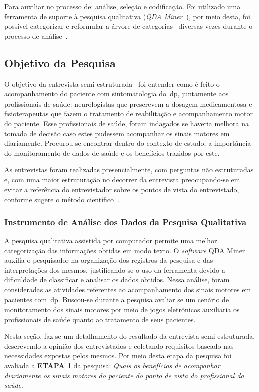 Para auxiliar no processo de: análise, seleção e codificação. Foi utilizado uma ferramenta de suporte à pesquisa qualitativa (\textit{QDA Miner}~\cite{qda13}), por meio desta, foi possível categorizar e reformular a árvore de categorias~\cite{FLI04} diversas vezes durante o processo de análise~\cite{FLI04}.


\subsection{Objetivo da Pesquisa}
O objetivo da entrevista semi-estruturada~\cite{FLI04} foi entender como é feito o acompanhamento do paciente com sintomatologia do~\ac{dp}, juntamente aos profissionais de saúde: neurologistas que prescrevem a dosagem medicamentosa e fisioterapeutas que fazem o tratamento  de reabilitação e acompanhamento motor do paciente. Esse profissionais de saúde, foram indagados se haveria melhora na tomada de decisão caso estes pudessem acompanhar os sinais motores em diariamente. Procurou-se encontrar dentro do contexto de estudo, a importância do monitoramento de dados de saúde e os benefícios trazidos por este.

As entrevistas foram realizadas presencialmente, com perguntas não estruturadas e, com uma maior estruturação no decorrer da entrevista preocupando-se em evitar a referência do entrevistador sobre os pontos de vista do entrevistado, conforme sugere o método científico~\cite{FLI04}. 

\subsubsection{Instrumento de Análise dos Dados da Pesquisa Qualitativa} \label{section:analise_dados} 
A pesquisa qualitativa assistida por computador permite uma melhor categorização das informações obtidas em modo texto. O \textit{software} QDA Miner~\cite{qda13} auxilia o pesquisador na organização dos registros da pesquisa e das interpretações dos mesmos, justificando-se o uso da ferramenta devido a dificuldade de classificar e analisar os dados obtidos. Nessa análise, foram consideradas as atividades referentes ao acompanhamento dos sinais motores em pacientes com~\ac{dp}. Buscou-se durante a pesquisa avaliar se um cenário de monitoramento dos sinais motores por meio de jogos eletrônicos auxiliaria os profissionais de saúde quanto ao tratamento de seus pacientes.

Nesta seção, faz-se um detalhamento do resultado da entrevista semi-estruturada, descrevendo a opinião dos entrevistados e coletando requisitos baseado nas necessidades expostas pelos mesmos. Por meio desta etapa da pesquisa foi avaliada a \textbf{ETAPA 1} da pesquisa: \textit{Quais os benefícios de acompanhar diariamente os sinais motores do paciente do ponto de vista do profissional da saúde}.

